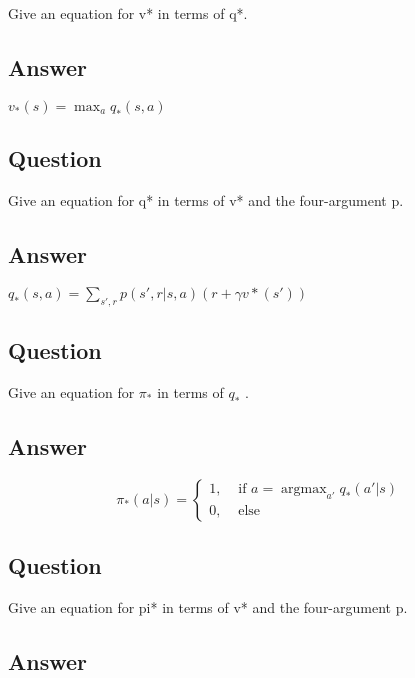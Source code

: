 \documentclass[11pt]{article}
\DeclareMathOperator*{\argmax}{argmax}
\begin{document}
    Give an equation for v* in terms of q*.

    \subsection*{Answer}

    $ v_{*}(s) = \max_{a} q_{*}(s,a) $

    \subsection{Question}

    Give an equation for q* in terms of v* and the four-argument p.

    \subsection*{Answer}

    $ q_{*}(s, a) = \sum_{s', r} p(s', r | s, a) ( r + \gamma v*(s') ) $

    \subsection{Question}

    Give an equation for $ \pi_{*} $ in terms of $ q_* $ .

    \subsection*{Answer}

    \begin{equation}
        \pi_*(a|s) =
        \begin{cases}
            1,& \text{ if } a = \argmax_{a'}q_{*}(a'|s) \\
            0,& \text{ else }
        \end{cases}
    \end{equation}

    \subsection{Question}

    Give an equation for pi* in terms of v* and the four-argument p.

    \subsection*{Answer}
\end{document}
